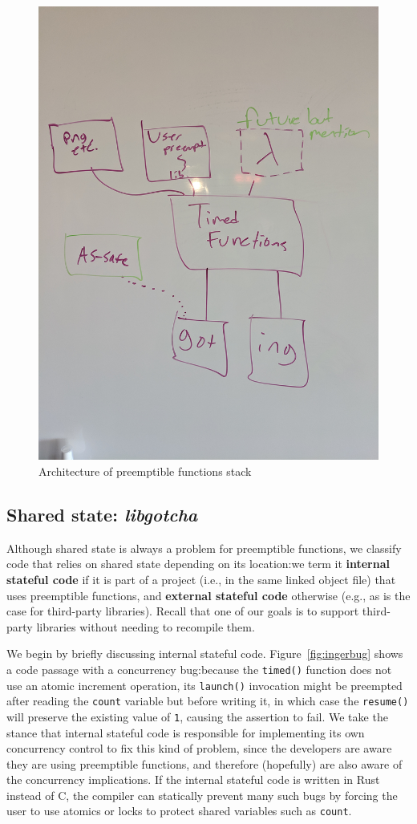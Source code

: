 \begin{figure}
\includegraphics[height=\columnwidth,angle=270]{figs/architecture}
\caption{Architecture of preemptible functions stack}
\label{fig:architecture}
\end{figure}

\subsection{Shared state: \textit{libgotcha}}
\label{sec:libgotcha}

Although shared state is always a problem for preemptible functions, we classify code
that relies on shared state depending on its location:\@ we term it \textbf{internal
stateful code} if it is part of a project (i.e., in the same linked object file)
that uses preemptible functions, and \textbf{external stateful code} otherwise (e.g.,
as is the case for third-party libraries).  Recall that one of our goals is to
support third-party libraries without needing to recompile them.

We begin by briefly discussing internal stateful code.  Figure~\ref{fig:ingerbug} shows
a code passage with a concurrency bug:\@ because the \texttt{timed()} function does
not use an atomic increment operation, its \texttt{launch()} invocation might be
preempted after reading the \texttt{count} variable but before writing it, in which
case the \texttt{resume()} will preserve the existing value of \texttt{1}, causing
the assertion to fail.  We take the stance that internal stateful code is responsible
for implementing its own concurrency control to fix this kind of problem, since the
developers are aware they are using preemptible functions, and therefore (hopefully)
are also aware of the concurrency implications.  If the internal stateful code is
written in Rust instead of C, the compiler can statically prevent many such bugs by
forcing the user to use atomics or locks to protect shared variables such as
\texttt{count}.

